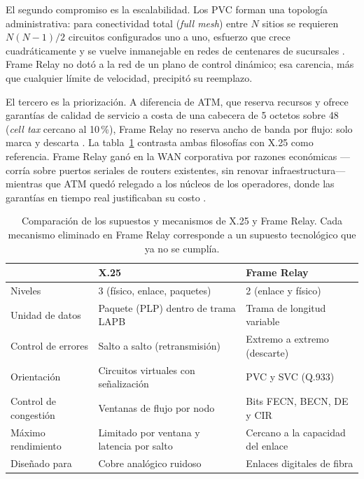 \documentclass[12pt,a4paper]{article}
\begin{document}
El segundo compromiso es la escalabilidad. Los PVC forman una topología administrativa: para conectividad total (\emph{full mesh}) entre $N$ sitios se requieren $N(N-1)/2$ circuitos configurados uno a uno, esfuerzo que crece cuadráticamente y se vuelve inmanejable en redes de centenares de sucursales \cite{buckwalter1999, cisco}. Frame Relay no dotó a la red de un plano de control dinámico; esa carencia, más que cualquier límite de velocidad, precipitó su reemplazo.

El tercero es la priorización. A diferencia de ATM, que reserva recursos y ofrece garantías de calidad de servicio a costa de una cabecera de 5 octetos sobre 48 (\emph{cell tax} cercano al 10\,\%), Frame Relay no reserva ancho de banda por flujo: solo marca y descarta \cite{stallings2014}. La tabla~\ref{tab:comparacion} contrasta ambas filosofías con X.25 como referencia. Frame Relay ganó en la WAN corporativa por razones económicas ---corría sobre puertos seriales de routers existentes, sin renovar infraestructura--- mientras que ATM quedó relegado a los núcleos de los operadores, donde las garantías en tiempo real justificaban su costo \cite{mcdysan1995}.

\begin{table}[h]
    \centering
    \small
    \begin{tabularx}{\textwidth}{l X X}
        \toprule
        & \textbf{X.25} & \textbf{Frame Relay} \\
        \midrule
        Niveles & 3 (físico, enlace, paquetes) & 2 (enlace y físico) \\
        Unidad de datos & Paquete (PLP) dentro de trama LAPB & Trama de longitud variable \\
        Control de errores & Salto a salto (retransmisión) & Extremo a extremo (descarte) \\
        Orientación & Circuitos virtuales con señalización & PVC y SVC (Q.933) \\
        Control de congestión & Ventanas de flujo por nodo & Bits FECN, BECN, DE y CIR \\
        Máximo rendimiento & Limitado por ventana y latencia por salto & Cercano a la capacidad del enlace \\
        Diseñado para & Cobre analógico ruidoso & Enlaces digitales de fibra \\
        \bottomrule
    \end{tabularx}
    \caption{Comparación de los supuestos y mecanismos de X.25 y Frame Relay. Cada mecanismo eliminado en Frame Relay corresponde a un supuesto tecnológico que ya no se cumplía.}
    \label{tab:comparacion}
\end{table}
\end{document}
